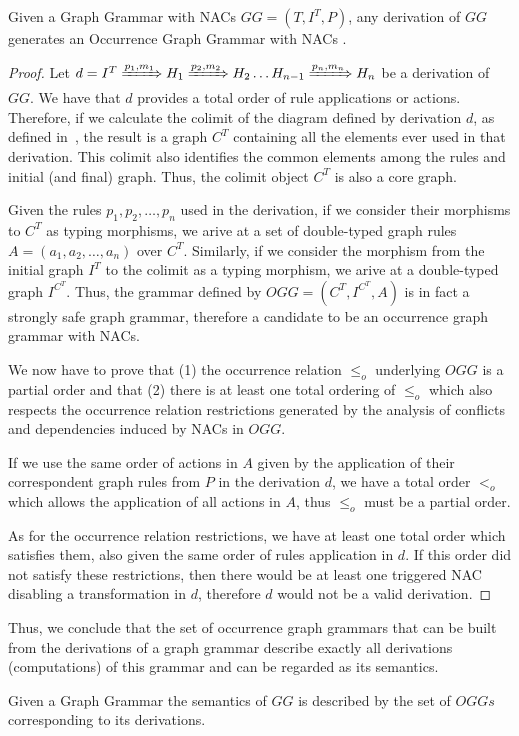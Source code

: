 \begin{thm} Given a Graph Grammar with NACs ${GG = (T,I^T,P)}$, any derivation of $GG$ generates an Occurrence Graph Grammar with NACs \occurrenceGrammar{}. 
\end{thm}

\begin{proof}

  Let $d = I^T \xRightarrow{p_1, m_1} H_1 \xRightarrow{p_2, m_2} H_2 \ldots H_{n-1} \xRightarrow{p_n, m_n} H_n$ be a derivation of $GG$.
  We have that $d$ provides a total order of rule applications or actions.
    Therefore, if we calculate the colimit of the diagram defined by derivation $d$, as defined in~\cite{Corradini1996}, the result is a graph $C^T$ containing all the elements ever used in that derivation.
  This colimit also identifies the common elements among the rules and initial (and final) graph. Thus, the colimit object $C^T$ is also a core graph.

Given the rules $p_1, p_2,\ldots,p_n$ used in the derivation, if we consider their morphisms to $C^T$ as typing morphisms, we arive at a set of double-typed graph rules $A = (a_1,a_2,\ldots,a_n)$ over $C^T$.
Similarly, if we consider the morphism from the initial graph $I^T$ to the colimit as a typing morphism, we arive at a double-typed graph $I^{C^T}$.
Thus, the grammar defined by $OGG = (C^T,I^{C^T},A)$ is in fact a strongly safe graph grammar, therefore a candidate to be an occurrence graph grammar with NACs.

We now have to prove that (1) the occurrence relation $\leq_o$ underlying $OGG$ is a partial order and that (2) there is at least one total ordering of $\leq_o$ which also respects the occurrence relation restrictions generated by the analysis of conflicts and dependencies induced by NACs in $OGG$.

If we use the same order of actions in $A$ given by the application of their correspondent graph rules from $P$ in the derivation $d$, we have a total order $<_o$ which allows the application of all actions in $A$, thus $\leq_o$ must be a partial order.

  As for the occurrence relation restrictions, we have at least one total order which satisfies them, also given the same order of rules application in $d$.
  If this order did not satisfy these restrictions, then there would be at least one triggered NAC disabling a transformation in $d$, therefore $d$ would not be a valid derivation.
\end{proof}

  Thus, we conclude that the set of occurrence graph grammars that can be built from the derivations of a graph grammar describe exactly all derivations (computations) of this grammar and can be regarded as its semantics.

\begin{definition} Given a Graph Grammar \graphGrammar{} the semantics of $GG$ is described by the set of $OGGs$ corresponding to its derivations.
\end{definition}
